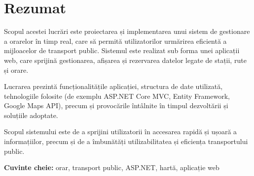 \section*{Rezumat}

Scopul acestei lucrări este proiectarea și implementarea unui sistem de gestionare a orarelor în timp real, care să permită utilizatorilor urmărirea eficientă a mijloacelor de transport public. Sistemul este realizat sub forma unei aplicații web, care sprijină gestionarea, afișarea și rezervarea datelor legate de stații, rute și orare.

Lucrarea prezintă funcționalitățile aplicației, structura de date utilizată, tehnologiile folosite (de exemplu ASP.NET Core MVC, Entity Framework, Google Maps API), precum și provocările întâlnite în timpul dezvoltării și soluțiile adoptate.

Scopul sistemului este de a sprijini utilizatorii în accesarea rapidă și ușoară a informațiilor, precum și de a îmbunătăți utilizabilitatea și eficiența transportului public.

\vspace{1cm}

\noindent\textbf{Cuvinte cheie:} orar, transport public, ASP.NET, hartă, aplicație web
